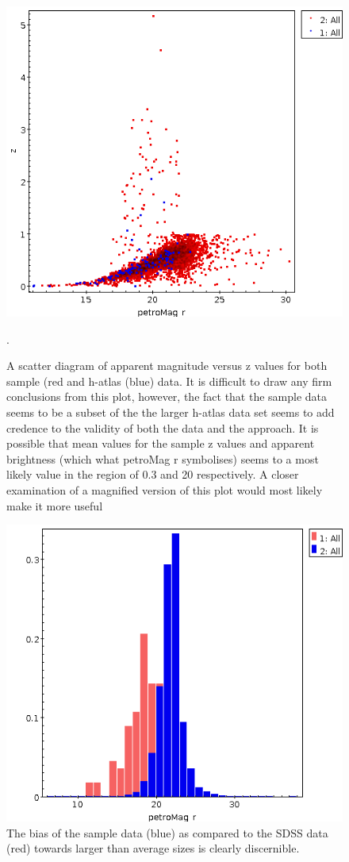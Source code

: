 \documentclass{article}
\begin{document}
\begin{figure}
    \centering
    \includegraphics[scale = 0.4]{combihands.png}
    \caption{A scatter diagram of apparent magnitude versus z values for both sample (red and h-atlas (blue) data. It is difficult to draw any firm conclusions from this plot, however, the fact that the sample data seems to be a subset of the the larger h-atlas data set seems to add credence to the validity of both the data and the approach. It is possible that mean values for the sample z values and apparent brightness (which what petroMag r symbolises) seems to a most likely value in the region of 0.3 and 20 respectively. A closer examination of a magnified version of this plot would most likely make it more useful}.
\end{figure}

\begin{figure}
    \centering
    \includegraphics[scale = 0.4]{combip.png}
    \caption{The bias of the sample data (blue) as compared to the SDSS data (red) towards larger than average sizes is clearly discernible.}
\end{figure}
\end{document}
